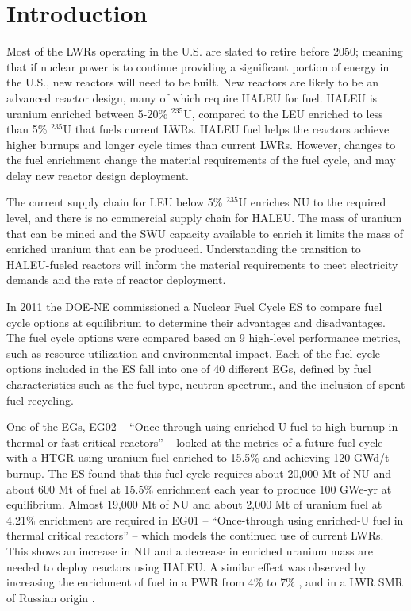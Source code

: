 \section{Introduction}

Most of the \glspl{LWR} operating in the U.S. are slated to retire
before 2050; meaning that if nuclear power is to continue providing a 
significant portion of energy in the U.S., new reactors will need to be built. 
New reactors are likely to be an advanced reactor design, many of 
which require \gls{HALEU} for fuel. \gls{HALEU} is uranium  
enriched between 5-20\% $^{235}$U, compared to the \gls{LEU} enriched to 
less than 5\% $^{235}$U that fuels current \glspl{LWR}. \gls{HALEU} fuel helps 
the reactors achieve higher burnups and longer cycle times than current 
\glspl{LWR}. However, changes to the fuel enrichment change the material 
requirements of the fuel cycle, and may delay 
new reactor design deployment.

The current supply chain for \gls{LEU} below 5\% $^{235}$U 
enriches \gls{NU} to the required level, and there is no commercial 
supply chain for \gls{HALEU}.  
The mass of uranium that can be mined and the \gls{SWU} capacity available 
to enrich it limits the mass of enriched uranium that can be 
produced. Understanding 
the transition to \gls{HALEU}-fueled reactors will inform the material 
requirements to meet electricity demands and 
the rate of reactor deployment.

In 2011 the \gls{DOE-NE} commissioned a Nuclear Fuel Cycle \gls{ES} 
\cite{wigeland_nuclear_2014} to compare fuel cycle options at equilibrium
to determine their advantages and disadvantages. The fuel cycle options were 
compared 
based on 9 high-level performance metrics, such as resource utilization and 
environmental impact. Each of the fuel cycle options included in the 
\gls{ES} fall into one of 40 different \glspl{EG}, defined by fuel 
characteristics such as the fuel type, neutron spectrum, and the inclusion 
of spent fuel recycling. 

One of the \glspl{EG}, \gls{EG}02 -- ``Once-through using enriched-U fuel to 
high burnup in thermal or fast critical reactors'' -- looked at the metrics 
of a future fuel cycle with a \gls{HTGR} using uranium fuel enriched to 
15.5\% and achieving 120 GWd/t burnup. The \gls{ES} found that this fuel cycle
requires about 20,000 Mt of \gls{NU} and about 600 Mt of fuel at 15.5\% 
enrichment each year 
to produce 100 GWe-yr at equilibrium. Almost 19,000 Mt of \gls{NU} and 
about 2,000 Mt of uranium fuel at 4.21\%
enrichment are required in \gls{EG}01 -- ``Once-through using enriched-U 
fuel in thermal critical reactors'' -- which models the continued use of current 
\glspl{LWR}. This shows an increase in \gls{NU} and a decrease in enriched uranium 
mass are needed to deploy reactors using \gls{HALEU}.
A similar effect was observed by increasing the enrichment of fuel in a 
\gls{PWR} from 4\% to 7\% \cite{burns_reactor_2020}, and in a \gls{LWR}
\gls{SMR} of Russian origin \cite{hernandez_potential_2020}. 

